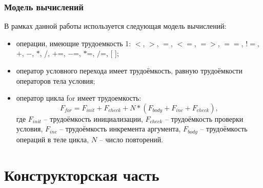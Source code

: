 \documentclass[12pt, a4paper]{report}
\begin{document}
	\subsection{Модель вычислений}
	В рамках данной работы используется следующая модель вычислений:
	\begin{itemize}
		\item операции, имеющие трудоемкость 1: $<$, $>$, $=$, $<=$, $=>$, $==$, $!=$,$+$, $-$, $\ast$, /, $+$=, $-$=, $\ast$=, $/$=, [ ];
		\item оператор условного перехода имеет трудоёмкость, равную трудоёмкости операторов тела условия;
		\item оператор цикла for имеет трудоемкость:
		\begin{equation}
		\label{for_cost}
		F_{for} = F_{init} + F_{check} + N \ast (F_{body} + F_{inc} + F_{check}),
		\end{equation}
		где $F_{init}$ -- трудоёмкость инициализации, $F_{check}$ -- трудоёмкость проверки условия, $F_{inc}$ -- трудоёмкость инкремента аргумента, $F_{body}$ -- трудоёмкость операций в теле цикла, $N$ -- число повторений.
	\end{itemize}
	

	\chapter{Конструкторская часть}
	
\end{document}
